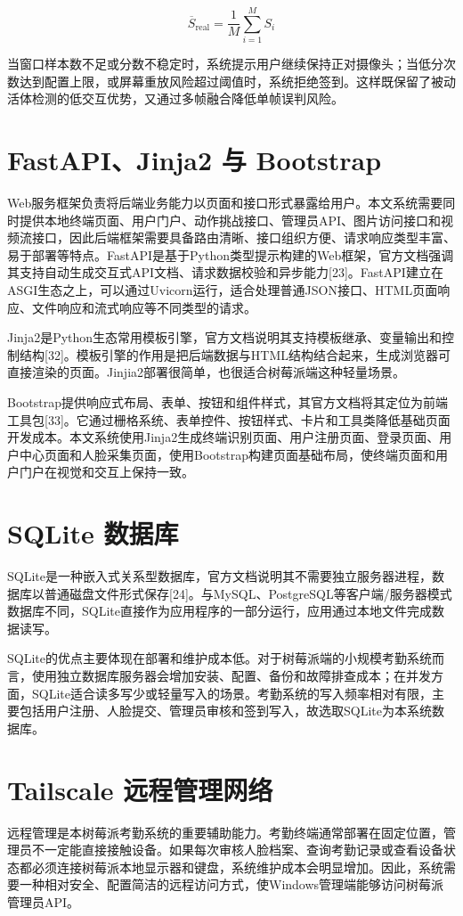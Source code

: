 \documentclass[UTF8]{heuthesis}
\begin{document}
\begin{equation*}
\overline{S}_{\mathrm{real}}=\frac{1}{M}\sum_{i=1}^{M}S_i\tag{2.4}
\end{equation*}

当窗口样本数不足或分数不稳定时，系统提示用户继续保持正对摄像头；当低分次数达到配置上限，或屏幕重放风险超过阈值时，系统拒绝签到。这样既保留了被动活体检测的低交互优势，又通过多帧融合降低单帧误判风险。

\section{FastAPI、Jinja2 与 Bootstrap}
Web服务框架负责将后端业务能力以页面和接口形式暴露给用户。本文系统需要同时提供本地终端页面、用户门户、动作挑战接口、管理员API、图片访问接口和视频流接口，因此后端框架需要具备路由清晰、接口组织方便、请求响应类型丰富、易于部署等特点。FastAPI是基于Python类型提示构建的Web框架，官方文档强调其支持自动生成交互式API文档、请求数据校验和异步能力[23]。FastAPI建立在ASGI生态之上，可以通过Uvicorn运行，适合处理普通JSON接口、HTML页面响应、文件响应和流式响应等不同类型的请求。

Jinja2是Python生态常用模板引擎，官方文档说明其支持模板继承、变量输出和控制结构[32]。模板引擎的作用是把后端数据与HTML结构结合起来，生成浏览器可直接渲染的页面。Jinjia2部署很简单，也很适合树莓派端这种轻量场景。

Bootstrap提供响应式布局、表单、按钮和组件样式，其官方文档将其定位为前端工具包[33]。它通过栅格系统、表单控件、按钮样式、卡片和工具类降低基础页面开发成本。本文系统使用Jinja2生成终端识别页面、用户注册页面、登录页面、用户中心页面和人脸采集页面，使用Bootstrap构建页面基础布局，使终端页面和用户门户在视觉和交互上保持一致。

\section{SQLite 数据库}
SQLite是一种嵌入式关系型数据库，官方文档说明其不需要独立服务器进程，数据库以普通磁盘文件形式保存[24]。与MySQL、PostgreSQL等客户端/服务器模式数据库不同，SQLite直接作为应用程序的一部分运行，应用通过本地文件完成数据读写。

SQLite的优点主要体现在部署和维护成本低。对于树莓派端的小规模考勤系统而言，使用独立数据库服务器会增加安装、配置、备份和故障排查成本；在并发方面，SQLite适合读多写少或轻量写入的场景。考勤系统的写入频率相对有限，主要包括用户注册、人脸提交、管理员审核和签到写入，故选取SQLite为本系统数据库。

\section{Tailscale 远程管理网络}
远程管理是本树莓派考勤系统的重要辅助能力。考勤终端通常部署在固定位置，管理员不一定能直接接触设备。如果每次审核人脸档案、查询考勤记录或查看设备状态都必须连接树莓派本地显示器和键盘，系统维护成本会明显增加。因此，系统需要一种相对安全、配置简洁的远程访问方式，使Windows管理端能够访问树莓派管理员API。
\end{document}
